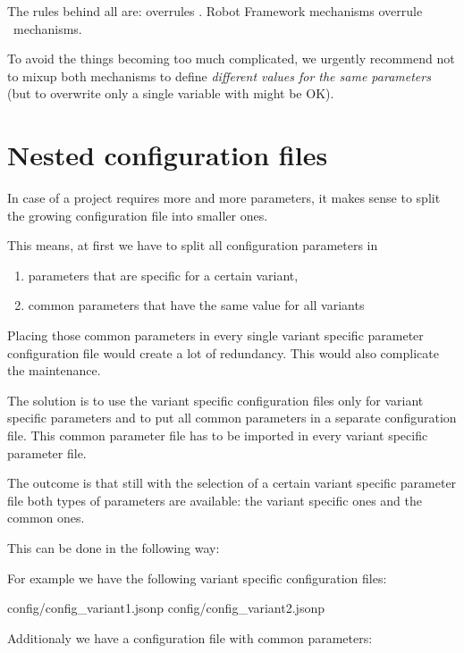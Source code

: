 The rules behind all are:  overrules . Robot Framework mechanisms overrule \pkg\ mechanisms.

To avoid the things becoming too much complicated, we urgently recommend not to mixup both mechanisms to define \textit{different values for the same parameters}
(but to overwrite only a single variable with  might be OK).


\newpage

\section{Nested configuration files}

In case of a project requires more and more parameters, it makes sense to split the growing configuration file into smaller ones.

This means, at first we have to split all configuration parameters in
\begin{enumerate}
   \item parameters that are specific for a certain variant,
   \item common parameters that have the same value for all variants
\end{enumerate}

Placing those common parameters in every single variant specific parameter configuration file would create a lot of redundancy.
This would also complicate the maintenance.

The solution is to use the variant specific configuration files only for variant specific parameters and to put all common parameters in
a separate configuration file. This common parameter file has to be imported in every variant specific parameter file.

The outcome is that still with the selection of a certain variant specific parameter file both types of parameters are available:
the variant specific ones and the common ones.

This can be done in the following way:

For example we have the following variant specific configuration files:

\begin{pythonlog}
config/config_variant1.jsonp
config/config_variant2.jsonp
\end{pythonlog}

Additionaly we have a configuration file with common parameters:

